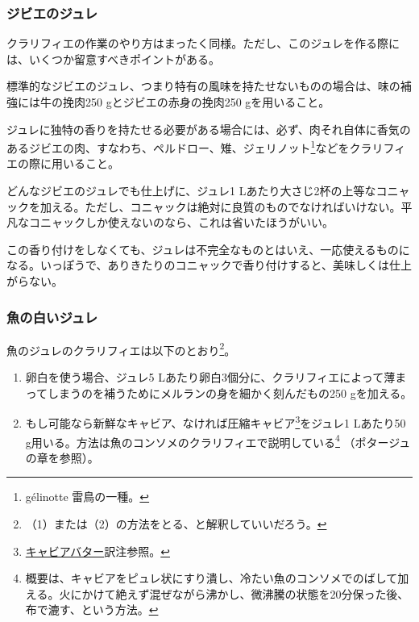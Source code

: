 \begin{recette}
\atoaki{}

\hypertarget{gelee-de-gibier}{%
\subsubsection{ジビエのジュレ}\label{gelee-de-gibier}}



クラリフィエの作業のやり方はまったく同様。ただし、このジュレを作る際には、いくつか留意すべきポイントがある。

標準的なジビエのジュレ、つまり特有の風味を持たせないものの場合は、味の補強には牛の挽肉250
gとジビエの赤身の挽肉250 gを用いること。

ジュレに独特の香りを持たせる必要がある場合には、必ず、肉それ自体に香気のあるジビエの肉、すなわち、ペルドロー、雉、ジェリノット\footnote{gélinotte
  雷鳥の一種。}などをクラリフィエの際に用いること。

どんなジビエのジュレでも仕上げに、ジュレ1
Lあたり大さじ2杯の上等なコニャックを加える。ただし、コニャックは絶対に良質のものでなければいけない。平凡なコニャックしか使えないのなら、これは省いたほうがいい。

この香り付けをしなくても、ジュレは不完全なものとはいえ、一応使えるものになる。いっぽうで、ありきたりのコニャックで香り付けすると、美味しくは仕上がらない。

\atoaki{}

\hypertarget{gelee-de-poisson-blanche}{%
\subsubsection{魚の白いジュレ}\label{gelee-de-poisson-blanche}}



魚のジュレのクラリフィエは以下のとおり\footnote{（1）または（2）の方法をとる、と解釈していいだろう。}。

\begin{enumerate}
\def\labelenumi{\arabic{enumi}.}
\item
  卵白を使う場合、ジュレ5
  Lあたり卵白3個分に、クラリフィエによって薄まってしまうのを補うためにメルランの身を細かく刻んだもの250
  gを加える。
\item
  もし可能なら新鮮なキャビア、なければ圧縮キャビア\footnote{\protect\hyperlink{beurre-de-caviar}{キャビアバター}訳注参照。}をジュレ1
  Lあたり50
  g用いる。方法は魚のコンソメのクラリフィエで説明している\footnote{概要は、キャビアをピュレ状にすり潰し、冷たい魚のコンソメでのばして加える。火にかけて絶えず混ぜながら沸かし、微沸騰の状態を20分保った後、布で漉す、という方法。}
  （ポタージュの章を参照）。
\end{enumerate}


\end{recette}
